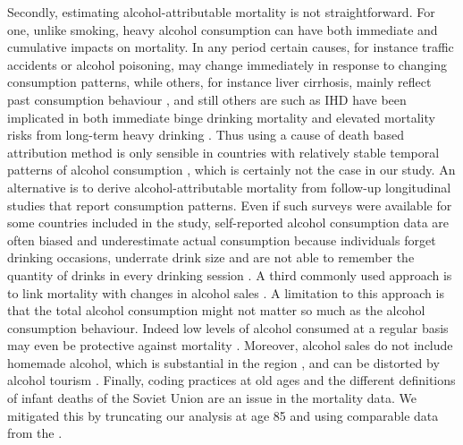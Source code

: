 \documentclass{article}
\begin{document}
\begin{spacing}{1.5}
Secondly, estimating alcohol-attributable mortality is not straightforward. For one, unlike smoking, heavy alcohol consumption can have both immediate and cumulative impacts on mortality. In any period certain causes, for instance traffic accidents or alcohol poisoning, may change immediately in response to changing consumption patterns, while others, for instance liver cirrhosis, mainly reflect past consumption behaviour \citep{ menon2001pathogenesis, rehm2003relationship}, and still others are such as IHD have been implicated in both immediate binge drinking mortality \citep{kauhanen1997beer} and elevated mortality risks from long-term heavy drinking \citep{roerecke2014alcohol}. Thus using a cause of death based attribution method is only sensible in countries with relatively stable temporal patterns of alcohol consumption \citep{kraus2015changes,martikainen2014income}, which is certainly not the case in our study. An alternative is to derive alcohol-attributable mortality from follow-up longitudinal studies that report consumption patterns. Even if such surveys were available for some countries included in the study, self-reported alcohol consumption data are often biased and underestimate actual consumption because individuals forget drinking occasions, underrate drink size and are not able to remember the quantity of drinks in every drinking session \citep{livingston2015underreporting,bellis2009off}. A third commonly used approach is to link mortality with changes in alcohol sales \citep{ evgeny2010beverage}. A limitation to this approach is that the total alcohol consumption might not matter so much as the alcohol consumption behaviour. Indeed low levels of alcohol consumed at a regular basis may even be protective against mortality \citep{bell2017,rehm2010relation, klatsky1974alcohol, roerecke2014alcohol}. Moreover, alcohol sales do not include homemade alcohol, which is substantial in the region \citep{popova2007comparing,mckee2005composition}, and can be distorted by alcohol tourism \citep{makela2009weakening,rabinovich2009affordability}. Finally, coding practices at old ages and the different definitions of infant deaths of the Soviet Union are an issue in the mortality data. We mitigated this by truncating our analysis at age 85 and using comparable data from the \cite{HcO}. \\


\end{spacing}
\end{document}
